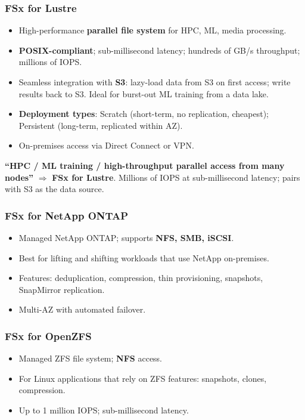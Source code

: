 \subsubsection{FSx for Lustre}

\begin{itemize}
  \item High-performance \textbf{parallel file system} for HPC, ML, media processing.
  \item \textbf{POSIX-compliant}; sub-millisecond latency; hundreds of GB/s throughput;
        millions of IOPS.
  \item Seamless integration with \textbf{S3}: lazy-load data from S3 on first access;
        write results back to S3. Ideal for burst-out ML training from a data lake.
  \item \textbf{Deployment types}: Scratch (short-term, no replication, cheapest);
        Persistent (long-term, replicated within AZ).
  \item On-premises access via Direct Connect or VPN.
\end{itemize}

\begin{examtip}
\textbf{``HPC / ML training / high-throughput parallel access from many nodes''} $\Rightarrow$ \textbf{FSx for Lustre}.
Millions of IOPS at sub-millisecond latency; pairs with S3 as the data source.
\end{examtip}

\subsubsection{FSx for NetApp ONTAP}

\begin{itemize}
  \item Managed NetApp ONTAP; supports \textbf{NFS, SMB, iSCSI}.
  \item Best for lifting and shifting workloads that use NetApp on-premises.
  \item Features: deduplication, compression, thin provisioning, snapshots, SnapMirror replication.
  \item Multi-AZ with automated failover.
\end{itemize}

\subsubsection{FSx for OpenZFS}

\begin{itemize}
  \item Managed ZFS file system; \textbf{NFS} access.
  \item For Linux applications that rely on ZFS features: snapshots, clones, compression.
  \item Up to 1 million IOPS; sub-millisecond latency.
\end{itemize}

